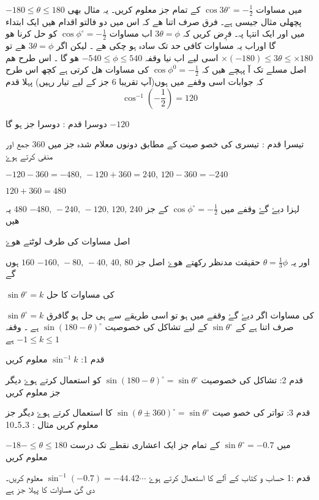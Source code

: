 



 \( -180\leq \theta\leq180 \)
میں مساوات
 \( \cos 3\theta^{\circ} =-\frac{1}{2}\)
 کے تمام جز معلوم کریں۔ یہ مثال بھی پچھلی مثال جیسی ہے۔ فرق صرف اتنا ھے کہ اس میں دو فالتو اقدام ھیں ایک ابتداء میں اور ایک انتہا پہ۔
فرٖٖض کریں  کہ
\( 3\theta=\phi\) 
 اب مساوات
\(\cos \phi^{\circ} = -\frac{1}{2} \) 
کو حل کرنا ھو گا اوراب یہ مساوات کافی حد تک سادہ ہو چکی ھے ۔ لیکن اگر
\( 3\theta=\phi\) 
ھے  تو 
\(\times\left(-180\right)\leq3\theta\leq\times180\)
 اسی لیے اب نیا وقفہ 
\( -540\leq\phi\leq 540 \) 
ھو گا ۔ اس طرح ھم اصل مسلے تک آ پہچے ھیں کہ
 \( \cos\phi^{0} =-\frac{1}{2} \)
 کی مساوات ھل کرتی ہے کچھ اس طرح کہ جوابات اسی وقفے میں ہوں(آپ تقریبا 6 جز کے لیے تیار رہیں)
پہلا قدم
\[ \cos^{-1}( -\frac{1}{2} )=120 \]

دوسرا قدم : دوسرا جز ہو گا 
\(-120\)

تیسرا قدم : تیسری کی خصو صیت کے مطابق دونوں معلام شدہ جز  میں \( 360 \) جمع اور منفی کرتے ہوۓ 

\( -120-360=-480, \, -120+360=240,\,120-360=-240 \) 

\( 120+360=480 \) 


لہزا دیۓ گۓ وقفے میں \( \cos \phi^{\circ} = -\frac{1}{2} \) کے جز \( -480,\,-240,\,-120,\,120,\,240 \) 	\( 480 \) 
 یہ ھیں

اصل مساوات کی طرف لوٹتے ھوۓ

اور یہ \( \theta = \frac{1}{3}\phi \)  حقیقت مدنظر رکھتے ھوۓ اصل جز \( -160,\,-80,\,-40,\,40,\,80 \) \( 160 \) ہوں گے

\( \sin\theta^{\circ}=k \) 
  کی مساوات کا حل 

 \( \sin\theta^{\circ}=k \) 
کی مساوات اگر دیۓ گۓ وقفے میں ہو تو اسی طریقے سے ہی حل ہو گافرق صرف اتنا ہے کے  \( \sin\theta^{\circ} \)  کے لیے تشاکل کی خصوصیت \( \sin\left(180-\theta\right)^{\circ} \) ہے ۔ وقفہ \( -1\leqslant k \leqslant1 \) 
 ہے

قدم 1:  \( \sin^{-1}k \) معلوم کریں

قدم 2:  تشاکل کی خصوصیت \( \sin\left(180-\theta\right)^{\circ}=\sin\theta^{\circ} \)  کو استعمال کرتے ہوۓ دیگر جز معلوم کریں
   
قدم 3: تواتر کی خصو صیت \(\sin\left(\theta\pm360\right)^{\circ}=\sin\theta^{\circ} \) 
 کا استعمال کرتے ہوۓ دیگر جز معلوم کریں
مثال  : 3۔5۔10

 \( -18-\leqslant\theta\leqslant180 \) میں \( \sin\theta^{\circ}=-0.7 \) کے تمام جز ایک اعشاری نقطے تک درست معلوم کریں 

قدم :1 حساب و کتاب کے آلے کا استعمال کرتے ہوۓ \( \sin^{-1}\left(-0.7\right)=-44.42\cdots \) معلوم کریں۔ دی گئ مساوات کا پہلا جز ہے  

